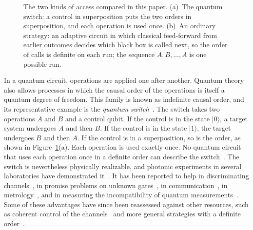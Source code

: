 \documentclass[11pt,letterpaper]{article}
\theoremstyle{definition}\newtheorem{definition}[theorem]{Definition}
\newcommand{\ket}[1]{\lvert#1\rangle}
\newcommand{\reffig}[1]{Figure~\ref{#1}}
\begin{document}
\begin{figure}[t]
\caption{The two kinds of access compared in this paper. (a)~The quantum
switch: a control in superposition puts the two orders in
superposition, and each operation is used once. (b)~An ordinary
strategy: an adaptive circuit in which classical feed-forward from
earlier outcomes decides which black box is called next, so the order
of calls is definite on each run; the sequence
$A,B,\dots,A$ is one possible run.}
\label{fig:switch}
\end{figure}

In a quantum circuit, operations are applied one after another. Quantum
theory also allows processes in which the causal order of the
operations is itself a quantum degree of freedom. This family is known
as indefinite causal order, and its representative example is the
\emph{quantum switch}~\cite{chiribella2013}. The switch takes two
operations $A$ and $B$ and a control qubit. If the control is in the
state $\ket0$, a target system undergoes $A$ and then $B$. If the
control is in the state $\ket1$, the target undergoes $B$ and then $A$.
If the control is in a superposition, so is the order, as shown in
\reffig{fig:switch}(a). Each operation is used exactly once. No quantum
circuit that uses each operation once in a definite order can describe
the switch~\cite{chiribella2013,araujo2015}. The switch is nevertheless
physically realizable, and photonic experiments in several laboratories
have demonstrated it~\cite{procopio2015,rozema2024}. It has been
reported to help in discriminating channels~\cite{chiribella2012}, in
promise problems on unknown gates~\cite{araujo2014}, in
communication~\cite{guerin2016,ebler2018}, in
metrology~\cite{zhao2020}, and in measuring the incompatibility of
quantum measurements~\cite{gao2023}. Some of these advantages have
since been reassessed against other resources, such as coherent control
of the channels~\cite{abbott2020} and more general strategies with a
definite order~\cite{mothe2024}.
\end{document}
